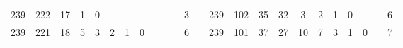 {\begin{tabular}{cccccccccccclccccccccccc}
239                                                & 222                                                & 17                                               & 1                                                & 0                                                &                                                  &                                                 &                                                 &                                                 &                                                 &                                                 & 3                                                &                          & 239                                                & 102                                                & 35                                               & 32                                               & 3                                               & 2                                               & 1                                               & 0                                               &                                                 &                                                 & 6                                                \\
239                                                & 221                                                & 18                                               & 5                                                & 3                                                & 2                                                & 1                                               & 0                                               &                                                 &                                                 &                                                 & 6                                                &                          & 239                                                & 101                                                & 37                                               & 27                                               & 10                                              & 7                                               & 3                                               & 1                                               & 0                                               &                                                 & 7                                                \\

\end{tabular}}
